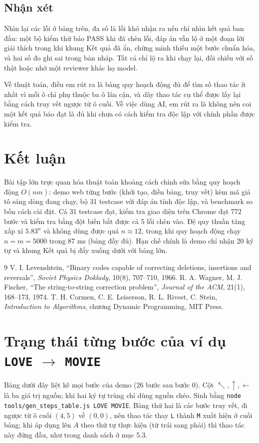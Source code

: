 \documentclass[12pt,a4paper]{article}
\newcommand{\code}[1]{\texttt{#1}}
\begin{document}
\subsection{Nhận xét}
Nhìn lại các lỗi ở bảng trên, đa số là lỗi khó nhận ra nếu chỉ nhìn kết quả ban đầu: một bộ kiểm thử báo PASS khi đã chèn lỗi, đáp án vẫn lộ ở một đoạn lời giải thích trong khi khung Kết quả đã ẩn, chứng minh thiếu một bước chuẩn hóa, và hai số đo ghi sai trong bản nháp. Tất cả chỉ lộ ra khi chạy lại, đối chiếu với số thật hoặc nhờ một reviewer khác họ model.

Về thuật toán, điều em rút ra là bảng quy hoạch động đủ để tìm số thao tác ít nhất vì mỗi ô chỉ phụ thuộc ba ô lân cận, và dãy thao tác cụ thể được lấy lại bằng cách truy vết ngược từ ô cuối. Về việc dùng AI, em rút ra là không nên coi một kết quả báo đạt là đủ khi chưa có cách kiểm tra độc lập với chính phần được kiểm tra.


\section{Kết luận}
Bài tập lớn trực quan hóa thuật toán khoảng cách chỉnh sửa bằng quy hoạch động $O(nm)$: demo web từng bước (khởi tạo, điền bảng, truy vết) kèm mã giả tô sáng dòng đang chạy, bộ 31 testcase với đáp án tính độc lập, và benchmark so bốn cách cài đặt. Cả 31 testcase đạt, kiểm tra giao diện trên Chrome đạt 772 bước và kiểm tra bằng đột biến bắt được cả 5 lỗi chèn vào. Đệ quy thuần tăng xấp xỉ $5.83^n$ và không dùng được quá $n\approx 12$, trong khi quy hoạch động chạy $n=m=5000$ trong 87 ms (bảng đầy đủ). Hạn chế chính là demo chỉ nhận 20 ký tự và khung Kết quả bị đẩy xuống dưới với bảng lớn.

\begin{thebibliography}{9}
 V. I. Levenshtein, ``Binary codes capable of correcting deletions, insertions and reversals'', \emph{Soviet Physics Doklady}, 10(8), 707--710, 1966.
 R. A. Wagner, M. J. Fischer, ``The string-to-string correction problem'', \emph{Journal of the ACM}, 21(1), 168--173, 1974.
 T. H. Cormen, C. E. Leiserson, R. L. Rivest, C. Stein, \emph{Introduction to Algorithms}, chương Dynamic Programming, MIT Press.
\end{thebibliography}

\appendix
\section{Trạng thái từng bước của ví dụ \code{LOVE} $\to$ \code{MOVIE}}\label{app:steps}
Bảng dưới đây liệt kê mọi bước của demo (26 bước sau bước 0). Cột $\nwarrow,\uparrow,\leftarrow$ là ba giá trị nguồn; khi hai ký tự trùng chỉ dùng nguồn chéo. Sinh bằng \code{node tools/gen\_steps\_table.js LOVE MOVIE}. Bảng thứ hai là các bước truy vết, đi ngược từ ô cuối $(4,5)$ về $(0,0)$, nên thao tác thay \code{L} thành \code{M} xuất hiện ở cuối bảng; khi áp dụng lên $A$ theo thứ tự thực hiện (từ trái sang phải) thì thao tác này đứng đầu, như trong danh sách ở mục 5.3.

\end{document}
